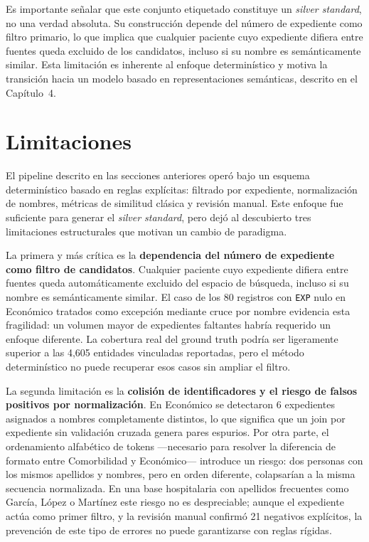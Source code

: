 Es importante señalar que este conjunto etiquetado constituye un \textit{silver standard}, no una verdad absoluta. Su construcción depende del número de expediente como filtro primario, lo que implica que cualquier paciente cuyo expediente difiera entre fuentes queda excluido de los candidatos, incluso si su nombre es semánticamente similar. Esta limitación es inherente al enfoque determinístico y motiva la transición hacia un modelo basado en representaciones semánticas, descrito en el Capítulo~4.

\section{Limitaciones}
\label{sec:limitaciones}

El pipeline descrito en las secciones anteriores operó bajo un esquema determinístico basado en reglas explícitas: filtrado por expediente, normalización de nombres, métricas de similitud clásica y revisión manual. Este enfoque fue suficiente para generar el \textit{silver standard}, pero dejó al descubierto tres limitaciones estructurales que motivan un cambio de paradigma.

La primera y más crítica es la \textbf{dependencia del número de expediente como filtro de candidatos}. Cualquier paciente cuyo expediente difiera entre fuentes queda automáticamente excluido del espacio de búsqueda, incluso si su nombre es semánticamente similar. El caso de los 80 registros con \texttt{EXP} nulo en Económico tratados como excepción mediante cruce por nombre evidencia esta fragilidad: un volumen mayor de expedientes faltantes habría requerido un enfoque diferente. La cobertura real del ground truth podría ser ligeramente superior a las 4,605 entidades vinculadas reportadas, pero el método determinístico no puede recuperar esos casos sin ampliar el filtro.

La segunda limitación es la \textbf{colisión de identificadores y el riesgo de falsos positivos por normalización}. En Económico se detectaron 6 expedientes asignados a nombres completamente distintos, lo que significa que un join por expediente sin validación cruzada genera pares espurios. Por otra parte, el ordenamiento alfabético de tokens ---necesario para resolver la diferencia de formato entre Comorbilidad y Económico--- introduce un riesgo: dos personas con los mismos apellidos y nombres, pero en orden diferente, colapsarían a la misma secuencia normalizada. En una base hospitalaria con apellidos frecuentes como García, López o Martínez este riesgo no es despreciable; aunque el expediente actúa como primer filtro, y la revisión manual confirmó 21 negativos explícitos, la prevención de este tipo de errores no puede garantizarse con reglas rígidas.

